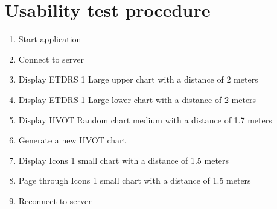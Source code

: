 \documentclass[12pt,a4paper,notitlepage]{report}
\begin{document}
\section{Usability test procedure \label{app:usability}}
\begin{enumerate}\bfseries

\item Start application

\item Connect to server

\item Display ETDRS 1 Large upper chart with a distance of 2 meters

\item Display ETDRS 1 Large lower chart with a distance of 2 meters

\item Display HVOT Random chart medium with a distance of 1.7 meters

\item Generate a new HVOT chart

\item Display Icons 1 small chart with a distance of 1.5 meters

\item Page through Icons 1 small chart with a distance of 1.5 meters

\item Reconnect to server

\end{enumerate}
\end{document}
